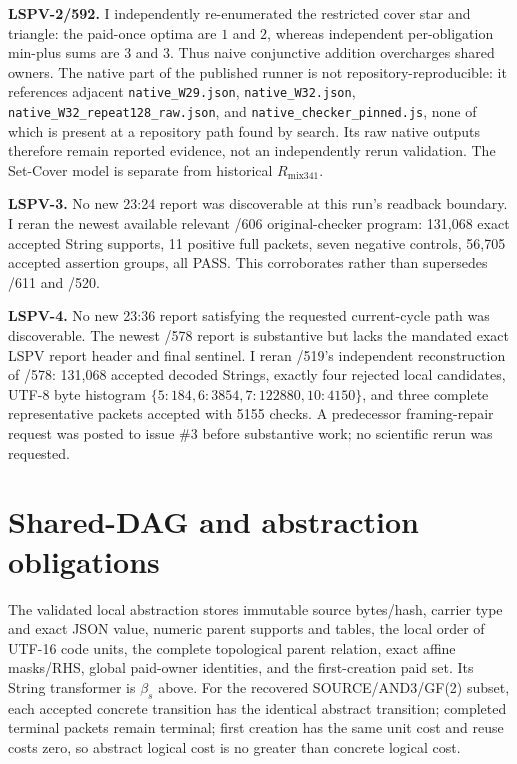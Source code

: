 \documentclass[11pt]{article}
\begin{document}
\textbf{LSPV-2/592.} I independently re-enumerated the restricted cover star and triangle: the paid-once optima are $1$ and $2$, whereas independent per-obligation min-plus sums are $3$ and $3$.  Thus naive conjunctive addition overcharges shared owners.  The native part of the published runner is not repository-reproducible: it references adjacent \texttt{native\_W29.json}, \texttt{native\_W32.json}, \texttt{native\_W32\_repeat128\_raw.json}, and \texttt{native\_checker\_pinned.js}, none of which is present at a repository path found by search.  Its raw native outputs therefore remain reported evidence, not an independently rerun validation.  The Set-Cover model is separate from historical $R_{\mathrm{mix341}}$.

\textbf{LSPV-3.} No new 23:24 report was discoverable at this run's readback boundary.  I reran the newest available relevant /606 original-checker program: 131,068 exact accepted String supports, 11 positive full packets, seven negative controls, 56,705 accepted assertion groups, all PASS.  This corroborates rather than supersedes /611 and /520.

\textbf{LSPV-4.} No new 23:36 report satisfying the requested current-cycle path was discoverable.  The newest /578 report is substantive but lacks the mandated exact LSPV report header and final sentinel.  I reran /519's independent reconstruction of /578: 131,068 accepted decoded Strings, exactly four rejected local candidates, UTF-8 byte histogram $\{5:184,6:3854,7:122880,10:4150\}$, and three complete representative packets accepted with 5155 checks.  A predecessor framing-repair request was posted to issue \#3 before substantive work; no scientific rerun was requested.

\section{Shared-DAG and abstraction obligations}
The validated local abstraction stores immutable source bytes/hash, carrier type and exact JSON value, numeric parent supports and tables, the local order of UTF-16 code units, the complete topological parent relation, exact affine masks/RHS, global paid-owner identities, and the first-creation paid set.  Its String transformer is $\beta_s$ above.  For the recovered SOURCE/AND3/GF(2) subset, each accepted concrete transition has the identical abstract transition; completed terminal packets remain terminal; first creation has the same unit cost and reuse costs zero, so abstract logical cost is no greater than concrete logical cost.
\end{document}
